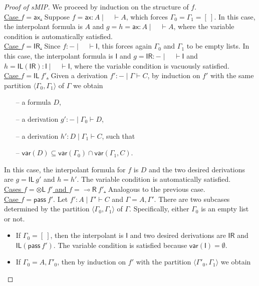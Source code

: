 \documentclass[sn-mathphys-num]{sn-jnl}%
\newcommand{\GG}{\Gamma}
\newcommand{\vd}{\vdash}
\newcommand{\tl}{\otimes \mathsf{L}}
\newcommand{\pass}{\mathsf{pass}}
\newcommand{\unitl}{\mathsf{IL}}
\newcommand{\unitr}{\mathsf{IR}}
\newcommand{\ax}{\mathsf{ax}}
\newcommand{\lolli}{\multimap}
\newcommand{\lright}{{\lolli}\mathsf{R}}
\newcommand{\unit}{\mathsf{I}}
\newcommand{\mf}[1]{\mathsf{#1}}
\newcommand{\vars}[1]{\mf{var} (#1)}
\newcommand{\sMIP}{\textsf{sMIP}}
\theoremstyle{thmstyleone}%
\theoremstyle{thmstyletwo}%
\theoremstyle{thmstylethree}%
\begin{document}
\begin{proof}[Proof of \sMIP]
  We proceed by induction on the structure of $f$. 
  \\
  \underline{Case $f = \ax$.} Suppose $f = \ax : A \mid \quad \vd A$, which forces $\GG_0 = \GG_1 = [\ ]$.
  In this case, the interpolant formula is $A$ and $g = h = \ax : A \mid \quad \vd A$, where the variable condition is automatically satisfied.
  \\
  \underline{Case $f = \unitr$.} Since $f : {-} \mid \quad \vd \unit$, this forces again $\GG_0$ and $\GG_1$ to be empty lists.
  In this case, the interpolant formula is $\unit$ and $g =  \unitr : {-} \mid \quad \vd \unit$ and $h = \unitl (\unitr) : \unit \mid \quad \vd \unit$, where the variable condition is vacuously satisfied.
  \\
  \underline{Case $f = \unitl \ f'$.}
  Given a derivation $f' : {-} \mid \GG \vd C$, by induction on $f'$ with the same partition $\langle \GG_0, \GG_1 \rangle$ of $\GG$ we obtain  
  \begin{itemize}
    \item[--] a formula $D$,
    \item[--] a derivation $g' : {-} \mid \GG_0 \vd D$,
    \item[--] a derivation $h' : D \mid \GG_1 \vd C$, such that
    \item[--] $\vars{D} \subseteq \vars{\GG_0} \cap \vars{\GG_1 , C}$.
  \end{itemize}
  In this case, the interpolant formula for $f$ is $D$ and the two desired derivations are $g = \unitl \ g'$ and $h = h'$.
  The variable condition is automatically satisfied.
  \\
  \underline{Cases $f = \tl \ f'$ and $f = \lright \ f'$.} Analogous to the previous case.
  \\
  \underline{Case $f = \pass \ f'$}. Let $f' : A \mid \GG' \vd C$ and $\GG = A,\GG'$.
  There are two subcases determined by the partition $\langle \GG_0,\GG_1 \rangle$ of $\GG$. 
  Specifically, either $\GG_0$ is an empty list or not.
  \begin{itemize}
    \item If $\GG_0 = [\ ]$, then the interpolant is $\unit$ and two desired derivations are $\unitr$ and $\unitl (\pass \ f')$.
    The variable condition is satisfied because $\vars{\unit} = \emptyset$.
    \item If $\GG_0 = A, \GG'_0$, then by induction on $f'$ with the partition $\langle \GG'_0, \GG_1 \rangle$ we obtain
    \begin{itemize}

\end{itemize}
\end{itemize}
\end{proof}
\end{document}
